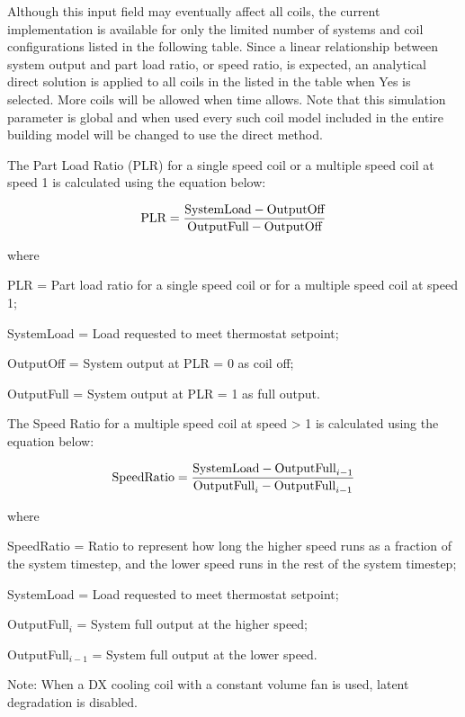 Although this input field may eventually affect all coils, the current implementation is available for only the limited number of systems and coil configurations listed in the following table. Since a linear relationship between system output and part load ratio, or speed ratio, is expected, an analytical direct solution is applied to all coils in the listed in the table when Yes is selected. More coils will be allowed when time allows. Note that this simulation parameter is global and when used every such coil model included in the entire building model will be changed to use the direct method.

The Part Load Ratio (PLR) for a single speed coil or a multiple speed coil at speed 1 is calculated using the equation below:

\begin{equation}
\textnormal{PLR} = \frac{\textnormal{SystemLoad} - \textnormal{OutputOff}}{\textnormal{OutputFull} - \textnormal{OutputOff}}
\end{equation}

where

PLR = Part load ratio for a single speed coil or for a multiple speed coil at speed 1;

SystemLoad = Load requested to meet thermostat setpoint;

OutputOff = System output at PLR = 0 as coil off;

OutputFull = System output at PLR = 1 as full output.

The Speed Ratio for a multiple speed coil at speed > 1 is calculated using the equation below:

\begin{equation}
\textnormal{SpeedRatio} = \frac{\textnormal{SystemLoad} - \textnormal{OutputFull}_{i-1}}{\textnormal{OutputFull}_{i} - \textnormal{OutputFull}_{i-1}}
\end{equation}

where

SpeedRatio = Ratio to represent how long the higher speed runs as a fraction of the system timestep, and the lower speed runs in the rest of the system timestep;

SystemLoad = Load requested to meet thermostat setpoint;

OutputFull$_{i}$ = System full output at the higher speed;

OutputFull$_{i-1}$ = System full output at the lower speed.

Note: When a DX cooling coil with a constant volume fan is used, latent degradation is disabled.

